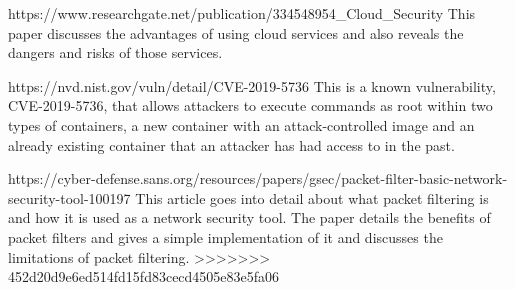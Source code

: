 https://www.researchgate.net/publication/334548954_Cloud_Security
This paper discusses the advantages of using cloud services and also reveals the dangers and risks of those services.

https://nvd.nist.gov/vuln/detail/CVE-2019-5736
This is a known vulnerability, CVE-2019-5736, that allows attackers to execute commands as root within two types of containers,
a new container with an attack-controlled image and an already existing container that an attacker has had access to in the past.

https://cyber-defense.sans.org/resources/papers/gsec/packet-filter-basic-network-security-tool-100197
This article goes into detail about what packet filtering is and how it is used as a network security tool.
The paper details the benefits of packet filters and gives a simple implementation of it and discusses
the limitations of packet filtering.
>>>>>>> 452d20d9e6ed514fd15fd83cecd4505e83e5fa06
